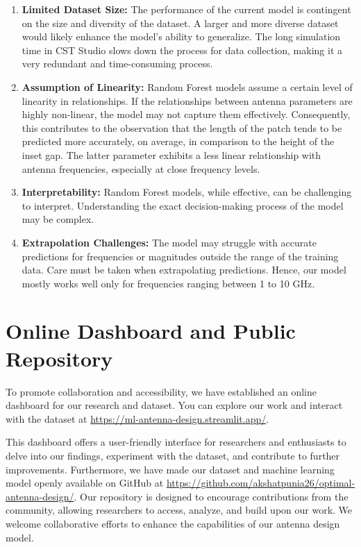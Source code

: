\documentclass[a4paper,12pt]{report}
\begin{document}
\begin{enumerate}
    \item \textbf{Limited Dataset Size:} The performance of the current model is contingent on the size and diversity of the dataset. A larger and more diverse dataset would likely enhance the model's ability to generalize. The long simulation time in CST Studio slows down the process for data collection, making it a very redundant and time-consuming process.

    \item \textbf{Assumption of Linearity:} Random Forest models assume a certain level of linearity in relationships. If the relationships between antenna parameters are highly non-linear, the model may not capture them effectively. Consequently, this contributes to the observation that the length of the patch tends to be predicted more accurately, on average, in comparison to the height of the inset gap. The latter parameter exhibits a less linear relationship with antenna frequencies, especially at close frequency levels.

    \item \textbf{Interpretability:} Random Forest models, while effective, can be challenging to interpret. Understanding the exact decision-making process of the model may be complex.

    \item \textbf{Extrapolation Challenges:} The model may struggle with accurate predictions for frequencies or magnitudes outside the range of the training data. Care must be taken when extrapolating predictions. Hence, our model mostly works well only for frequencies ranging between 1 to 10 GHz.
\end{enumerate}




\section{Online Dashboard and Public Repository}
\label{sec:final_comparison_and_shortcomings}

To promote collaboration and accessibility, we have established an online dashboard for our research and dataset. You can explore our work and interact with the dataset at \url{https://ml-antenna-design.streamlit.app/}.

This dashboard offers a user-friendly interface for researchers and enthusiasts to delve into our findings, experiment with the dataset, and contribute to further improvements.
Furthermore, we have made our dataset and machine learning model openly available on GitHub at \url{https://github.com/akshatpunia26/optimal-antenna-design/}. Our repository is designed to encourage contributions from the community, allowing researchers to access, analyze, and build upon our work. We welcome collaborative efforts to enhance the capabilities of our antenna design model.
\end{document}

